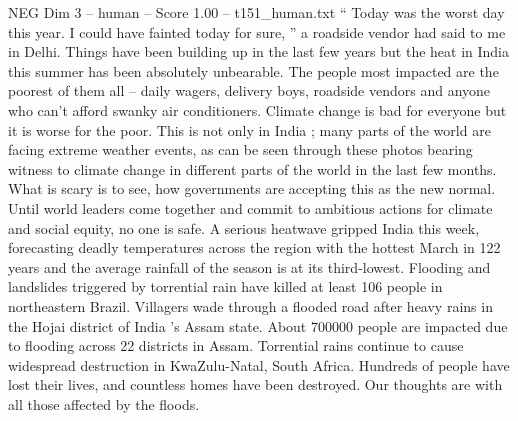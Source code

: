 \begin{textsample}{NEG Dim 3 – human – Score 1.00 – t151\_human.txt}  \label{ex:f3_neg_048}
“ Today was the worst day this year.
I could have fainted today for sure, ” a roadside vendor had said to me in Delhi.
Things have been building up in the last few years but the heat in India this summer has been absolutely unbearable.
The people most impacted are the poorest of them all – daily wagers, delivery boys, roadside vendors and anyone who can't afford swanky air conditioners.
Climate change is bad for everyone but it is worse for the poor.
This is not only in India ; many parts of the world are facing extreme weather events, as can be seen through these photos bearing witness to climate change in different parts of the world in the last few months.
What is scary is to see, how governments are accepting this as the new normal.
Until world leaders come together and commit to ambitious actions for climate and social equity, no one is safe.
A serious heatwave gripped India this week, forecasting deadly temperatures across the region with the hottest March in 122 years and the average rainfall of the season is at its third-lowest.
Flooding and landslides triggered by torrential rain have killed at least 106 people in northeastern Brazil.
Villagers wade through a flooded road after heavy rains in the Hojai district of India ’s Assam state.
About 700000 people are impacted due to flooding across 22 districts in Assam.
Torrential rains continue to cause widespread destruction in KwaZulu-Natal, South Africa.
Hundreds of people have lost their lives, and countless homes have been destroyed.
Our thoughts are with all those affected by the floods.

\end{textsample}
